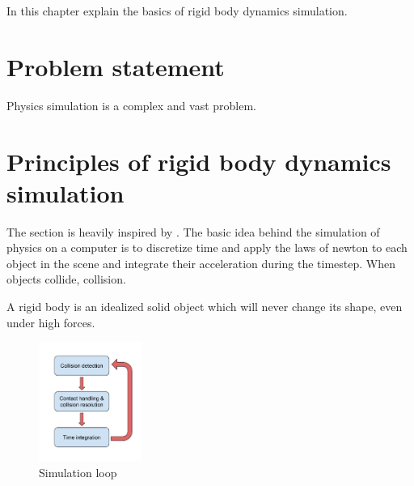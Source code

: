 In this chapter explain the basics of rigid body dynamics simulation.

\section{Problem statement}
Physics simulation is a complex and vast problem. 

\section{Principles of rigid body dynamics simulation}
The section is heavily inspired by \cite{bender2014interactive}.
The basic idea behind the simulation of physics on a computer is to discretize time and apply the laws of newton to each object in the scene and integrate their acceleration during the timestep. When objects collide, collision.

A rigid body is an idealized solid object which will never change its shape, even under high forces.

\begin{figure}[htp]
\center
\includegraphics[width=0.3\textwidth]{figures/star_simul_loop}
\caption[Simulation loop]{Simulation loop}
\label{fig:star_simul_loop}
\end{figure}

